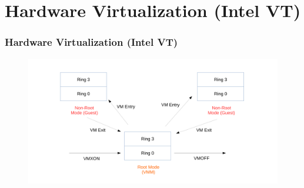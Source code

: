 \documentclass[aspectratio=169]{beamer}
\begin{document}

\section{Hardware Virtualization (Intel VT)}
\begin{frame}
\frametitle{Hardware Virtualization (Intel VT)}
\begin{figure}
\includegraphics[width=1.0\linewidth]{figures/vmx.pdf}
\end{figure}
\end{frame}

\end{document}

